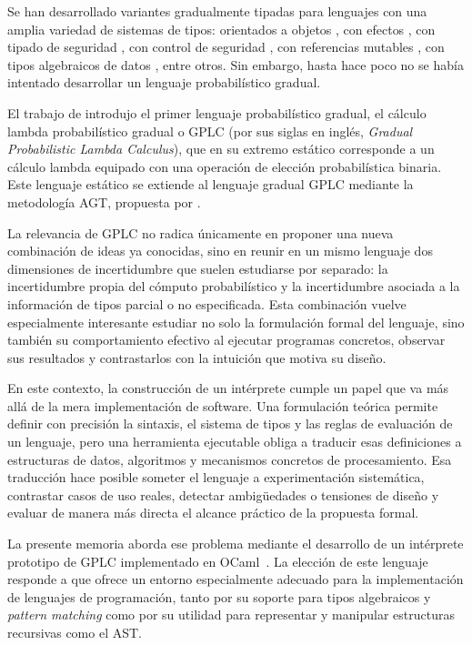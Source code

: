 Se han desarrollado variantes gradualmente tipadas para lenguajes con
una amplia variedad de sistemas de tipos: orientados a objetos
\citep{siek2007,taki2012}, con efectos \citep{banados2014},
con tipado de seguridad \citep{fennell2013}, con control de seguridad
\citep{toro2018}, con referencias mutables \citep{gt,siek2015c,toro2020}, con tipos algebraicos de datos
\citep{malewski2021}, entre otros. Sin embargo, hasta hace poco no se
había intentado desarrollar un lenguaje probabilístico gradual.

El trabajo de \cite{gplc} introdujo el primer lenguaje probabilístico
gradual, el cálculo lambda probabilístico gradual o GPLC (por sus
siglas en inglés, \emph{Gradual Probabilistic Lambda Calculus}), que
en su extremo estático corresponde a un cálculo lambda equipado con
una operación de elección probabilística binaria. Este lenguaje
estático se extiende al lenguaje gradual GPLC mediante la metodología
AGT, propuesta por \cite{agt}.


La relevancia de GPLC no radica únicamente en proponer una nueva
combinación de ideas ya conocidas, sino en reunir en un mismo lenguaje
dos dimensiones de incertidumbre que suelen estudiarse por separado:
la incertidumbre propia del cómputo probabilístico y la incertidumbre
asociada a la información de tipos parcial o no especificada. Esta
combinación vuelve especialmente interesante estudiar no solo la
formulación formal del lenguaje, sino también su comportamiento
efectivo al ejecutar programas concretos, observar sus resultados y
contrastarlos con la intuición que motiva su diseño.

En este contexto, la construcción de un intérprete cumple un papel que
va más allá de la mera implementación de software. Una formulación
teórica permite definir con precisión la sintaxis, el sistema de tipos
y las reglas de evaluación de un lenguaje, pero una herramienta
ejecutable obliga a traducir esas definiciones a estructuras de datos,
algoritmos y mecanismos concretos de procesamiento. Esa traducción
hace posible someter el lenguaje a experimentación sistemática,
contrastar casos de uso reales, detectar ambigüedades o tensiones de
diseño y evaluar de manera más directa el alcance práctico de la
propuesta formal.

La presente memoria aborda ese problema mediante el desarrollo de un
intérprete prototipo de GPLC implementado en
OCaml~\citep{ocaml-system}. La elección de este lenguaje responde a
que ofrece un entorno especialmente adecuado para la implementación de
lenguajes de programación, tanto por su soporte para tipos algebraicos
y \emph{pattern matching} como por su utilidad para representar y manipular
estructuras recursivas como el AST.


